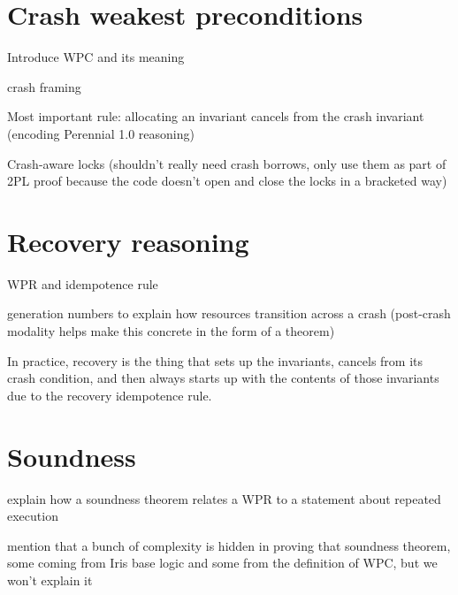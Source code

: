 \section{Crash weakest preconditions}

Introduce WPC and its meaning

crash framing

Most important rule: allocating an invariant cancels from the crash invariant
(encoding Perennial 1.0 reasoning)

Crash-aware locks (shouldn't really need crash borrows, only use them as part of
2PL proof because the code doesn't open and close the locks in a bracketed way)

\section{Recovery reasoning}

WPR and idempotence rule

generation numbers to explain how resources transition across a crash
(post-crash modality helps make this concrete in the form of a theorem)

In practice, recovery is the thing that sets up the invariants, cancels from its
crash condition, and then always starts up with the contents of those
invariants due to the recovery idempotence rule.

\section{Soundness}

explain how a soundness theorem relates a WPR to a statement about repeated
execution

mention that a bunch of complexity is hidden in proving that soundness theorem,
some coming from Iris base logic and some from the definition of WPC, but we
won't explain it
